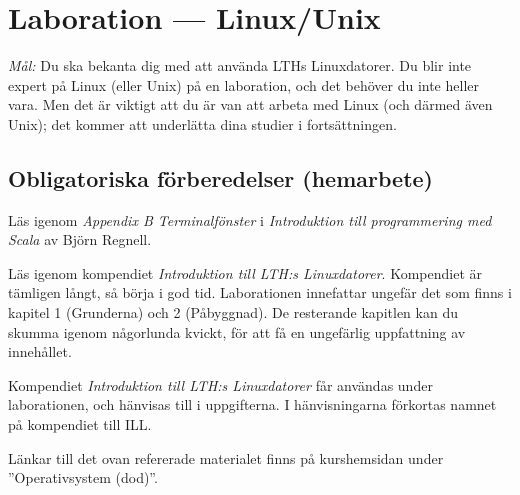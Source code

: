 \section{Laboration  --- Linux/Unix}
\label{lab:unix}
\emph{Mål:} Du ska bekanta dig med att använda LTHs Linuxdatorer. Du blir inte expert på Linux (eller Unix) på en laboration, och det behöver du inte heller vara. Men det är viktigt att du är van att arbeta med Linux (och därmed även Unix); det kommer att underlätta dina studier i fortsättningen.


\subsection*{Obligatoriska förberedelser (hemarbete)}
\begin{Hemarbete}
	\item Läs igenom \emph{Appendix B Terminalfönster} i \emph{Introduktion till programmering med Scala} av Björn Regnell.
	\item Läs igenom kompendiet  \emph{Introduktion till LTH:s Linuxdatorer}. Kompendiet är tämligen långt, så börja i god tid. Laborationen innefattar ungefär det som finns i kapitel 1 (Grunderna) och 2 (Påbyggnad). De resterande kapitlen kan du skumma igenom  någorlunda kvickt, för att få en ungefärlig uppfattning av innehållet.
	\item Kompendiet \emph{Introduktion till LTH:s Linuxdatorer} får användas under laborationen, och hänvisas till i uppgifterna. I hänvisningarna förkortas namnet på  kompendiet till ILL.
\end{Hemarbete}
Länkar till det ovan refererade materialet finns på kurshemsidan under  ''Operativsystem (dod)''.



